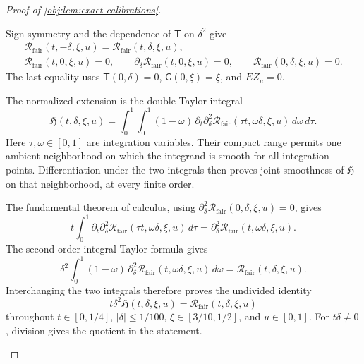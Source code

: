 \documentclass[11pt]{article}
\begin{document}
\begin{proof}[Proof of \cref{obj:lem:exact-calibrations}]
\begin{enumerate}
Sign symmetry and the dependence of \(\mathsf T\) on \(\delta^2\) give
\[
\begin{gathered}
\mathcal R_{\mathrm{fair}}(t,-\delta,\xi,u)
=\mathcal R_{\mathrm{fair}}(t,\delta,\xi,u),\\
\mathcal R_{\mathrm{fair}}(t,0,\xi,u)=0,
\qquad
\partial_\delta\mathcal R_{\mathrm{fair}}(t,0,\xi,u)=0,
\qquad
\mathcal R_{\mathrm{fair}}(0,\delta,\xi,u)=0.
\end{gathered}
\]
The last equality uses \(\mathsf T(0,\delta)=0\),
\(\mathsf G(0,\xi)=\xi\), and \(EZ_u=0\).

The normalized extension is the double Taylor integral
\[
\mathfrak H(t,\delta,\xi,u)
=
\int_0^1\int_0^1
(1-\omega)\,
\partial_t\partial_\delta^2
\mathcal R_{\mathrm{fair}}(\tau t,\omega\delta,\xi,u)
\,d\omega\,d\tau.
\]
Here \(\tau,\omega\in[0,1]\) are integration variables. Their compact range permits one ambient neighborhood on which the integrand is smooth for all integration points. Differentiation under the two integrals then proves joint smoothness of \(\mathfrak H\) on that neighborhood, at every finite order.

The fundamental theorem of calculus, using
\(\partial_\delta^2\mathcal R_{\mathrm{fair}}(0,\delta,\xi,u)=0\), gives
\[
t\int_0^1
\partial_t\partial_\delta^2
\mathcal R_{\mathrm{fair}}(\tau t,\omega\delta,\xi,u)\,d\tau
=
\partial_\delta^2
\mathcal R_{\mathrm{fair}}(t,\omega\delta,\xi,u).
\]
The second-order integral Taylor formula gives
\[
\delta^2\int_0^1
(1-\omega)\,
\partial_\delta^2
\mathcal R_{\mathrm{fair}}(t,\omega\delta,\xi,u)\,d\omega
=
\mathcal R_{\mathrm{fair}}(t,\delta,\xi,u).
\]
Interchanging the two integrals therefore proves the undivided identity
\[
t\delta^2\mathfrak H(t,\delta,\xi,u)
=\mathcal R_{\mathrm{fair}}(t,\delta,\xi,u)
\]
throughout
\(t\in[0,1/4]\), \(|\delta|\le1/100\),
\(\xi\in[3/10,1/2]\), and \(u\in[0,1]\).
For \(t\delta\ne0\), division gives the quotient in the statement.


\end{enumerate}
\end{proof}
\end{document}
